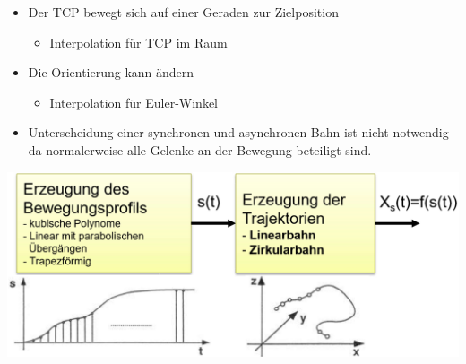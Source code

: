 \begin{minipage}{0.5\linewidth}
\begin{itemize}
    \item Der TCP bewegt sich auf einer Geraden zur Zielposition
    \begin{itemize}
        \item Interpolation für TCP im Raum
    \end{itemize}
\item Die Orientierung kann ändern
\begin{itemize}
    \item Interpolation für Euler-Winkel
\end{itemize}
\item Unterscheidung einer synchronen und asynchronen Bahn ist nicht notwendig da normalerweise alle Gelenke an der Bewegung beteiligt sind.
\end{itemize}
\end{minipage}
\begin{minipage}{0.5\linewidth}
    \includegraphics[width=\linewidth]{./bilder/Bahnsteuerung}
\end{minipage}

